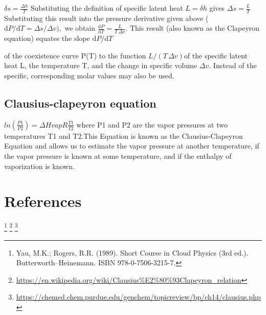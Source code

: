 \documentclass[12pt]{report}
\renewcommand{\>}{\ensuremath >\xspace}
\newcommand{\<}{\ensuremath <\xspace}
\begin{document}
${\delta} s={\frac  {\Delta h}{T}}
$
Substituting the definition of specific latent heat 
$
L={\delta} h
$
gives
$
{\Delta} s={\frac  {L}{T}}
$
Substituting this result into the pressure derivative given above (
${\displaystyle \mathrm {d} P/\mathrm {d} T={\Delta} s/{\Delta} v}), 
$
we obtain
${\displaystyle {\frac {\mathrm {d} P}{\mathrm {d} T}}={\frac {L}{T\,\Delta v}}.}
$
This result (also known as the Clapeyron equation) equates the slope 
${\mathrm{d}P}/{\mathrm{d}T}
$

of the coexistence curve
P(T) to the function 
${\displaystyle L/(T\,{\Delta} v)}
$of the specific latent heat 
L, the temperature 
T, and the change in specific volume 
${\Delta} v.
$
Instead of the specific, corresponding molar values may also be used.
\subsection{Clausius-clapeyron equation}
$ln({\frac{P1}{P2}})=ΔHvapR{\frac{T1}{T2}}
$
where P1 and P2 are the vapor pressures at two temperatures T1
 and T2.This Equation is known as the Clausius-Clapeyron Equation and allows us to estimate the vapor pressure at another temperature, if the vapor pressure is known at some temperature, and if the enthalpy of vaporization is known.
 \section{References}
 \footnote{Yau, M.K.; Rogers, R.R. (1989). Short Course in Cloud Physics (3rd ed.). Butterworth–Heinemann. ISBN 978-0-7506-3215-7.}
\footnote{\url{https://en.wikipedia.org/wiki/Clausius\%E2\%80\%93Clapeyron_relation}}
\footnote{\url{https://chemed.chem.purdue.edu/genchem/topicreview/bp/ch14/clausius.php}
}
\clearpage\singlespacing
\end{document}
